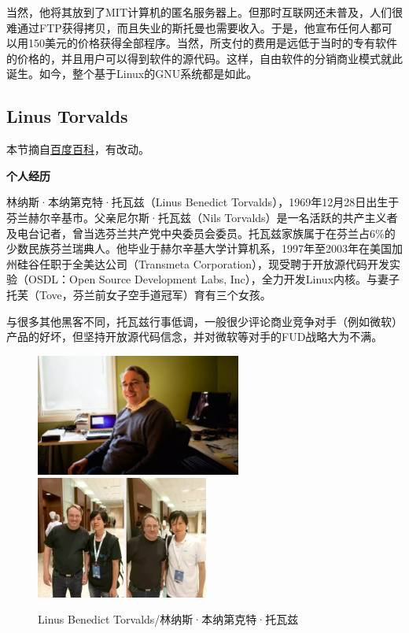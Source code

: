 \documentclass[doctor,openright,twoside]{sjtuthesis}
\theoremstyle{plain}
\theoremstyle{definition}
\theoremstyle{remark}
\theoremstyle{ocrenumbox}
\theoremstyle{plain}
\begin{document}
当然，他将其放到了MIT计算机的匿名服务器上。但那时互联网还未普及，人们很难通过FTP获得拷贝，而且失业的斯托曼也需要收入。于是，他宣布任何人都可以用150美元的价格获得全部程序。当然，所支付的费用是远低于当时的专有软件的价格的，并且用户可以得到软件的源代码。这样，自由软件的分销商业模式就此诞生。如今，整个基于Linux的GNU系统都是如此。

\hypertarget{linus-torvalds}{%
\subsection{Linus Torvalds}\label{linus-torvalds}}

本节摘自\href{https://baike.baidu.com/item/\%E6\%9E\%97\%E7\%BA\%B3\%E6\%96\%AF\%C2\%B7\%E6\%89\%98\%E7\%93\%A6\%E5\%85\%B9/2122821?fr=aladdin\&fromid=400810\&fromtitle=linus}{百度百科}，有改动。

\textbf{个人经历}

林纳斯·本纳第克特·托瓦兹（Linus Benedict
Torvalds），1969年12月28日出生于芬兰赫尔辛基市。父亲尼尔斯·托瓦兹（Nils
Torvalds）是一名活跃的共产主义者及电台记者，曾当选芬兰共产党中央委员会委员。托瓦兹家族属于在芬兰占6\%的少数民族芬兰瑞典人。他毕业于赫尔辛基大学计算机系，1997年至2003年在美国加州硅谷任职于全美达公司（Transmeta
Corporation），现受聘于开放源代码开发实验（OSDL：Open Source Development
Labs,
Inc），全力开发Linux内核。与妻子托芙（Tove，芬兰前女子空手道冠军）育有三个女孩。

与很多其他黑客不同，托瓦兹行事低调，一般很少评论商业竞争对手（例如微软）产品的好坏，但坚持开放源代码信念，并对微软等对手的FUD战略大为不满。

\begin{figure}[!htp]
  \centering
  \includegraphics[height=4cm]{images/linus.jpg}
  \hspace{1cm}
  \includegraphics[height=4cm]{images/deepin-linus.jpeg}
  \label{fig:linus}
  \caption{Linus Benedict Torvalds/林纳斯·本纳第克特·托瓦兹}
\end{figure}
\end{document}
